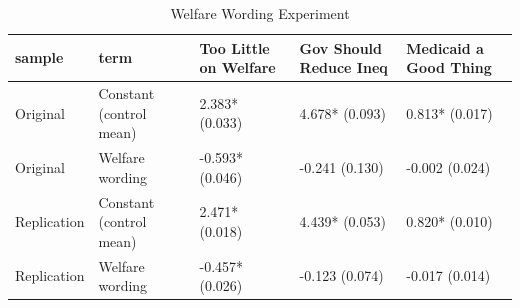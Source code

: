 \begin{table}[!h]
\centering
\caption{\label{tab:welfare}Welfare Wording Experiment}
\centering
\begin{tabular}[t]{lllll}
\toprule
sample & term & Too Little on Welfare & Gov Should Reduce Ineq & Medicaid a Good Thing\\
\midrule
Original & Constant (control mean) & 2.383*
(0.033) & 4.678*
(0.093) & 0.813*
(0.017)\\
Original & Welfare wording & -0.593*
(0.046) & -0.241
(0.130) & -0.002
(0.024)\\
Replication & Constant (control mean) & 2.471*
(0.018) & 4.439*
(0.053) & 0.820*
(0.010)\\
Replication & Welfare wording & -0.457*
(0.026) & -0.123
(0.074) & -0.017
(0.014)\\
\bottomrule
\end{tabular}
\end{table}
